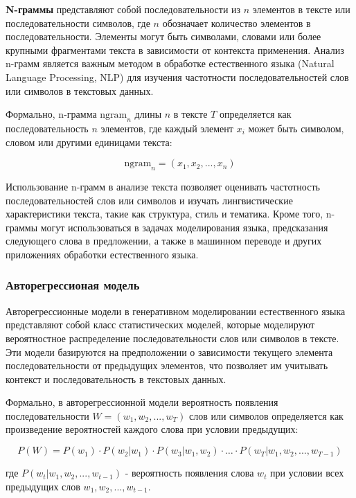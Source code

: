  \textbf{N-граммы} представляют собой последовательности из \( n \) элементов в тексте или последовательности символов, где \( n \) обозначает количество элементов в последовательности. Элементы могут быть символами, словами или более крупными фрагментами текста в зависимости от контекста применения. Анализ n-грамм является важным методом в обработке естественного языка (Natural Language Processing, NLP) для изучения частотности последовательностей слов или символов в текстовых данных.

Формально, n-грамма \( \text{ngram}_n \) длины \( n \) в тексте \( T \) определяется как последовательность \( n \) элементов, где каждый элемент \( x_i \) может быть символом, словом или другими единицами текста:

\[ \text{ngram}_n = (x_1, x_2, ..., x_n) \]

Использование n-грамм в анализе текста позволяет оценивать частотность последовательностей слов или символов и изучать лингвистические характеристики текста, такие как структура, стиль и тематика. Кроме того, n-граммы могут использоваться в задачах моделирования языка, предсказания следующего слова в предложении, а также в машинном переводе и других приложениях обработки естественного языка.

\subsubsection{Авторегрессионая модель}


Авторегрессионные модели в генеративном моделировании естественного языка представляют собой класс статистических моделей, которые моделируют вероятностное распределение последовательности слов или символов в тексте. Эти модели базируются на предположении о зависимости текущего элемента последовательности от предыдущих элементов, что позволяет им учитывать контекст и последовательность в текстовых данных.

Формально, в авторегрессионной модели вероятность появления последовательности \( W = (w_1, w_2, ..., w_T) \) слов или символов определяется как произведение вероятностей каждого слова при условии предыдущих:

\[ P(W) = P(w_1) \cdot P(w_2|w_1) \cdot P(w_3|w_1, w_2) \cdot \ldots \cdot P(w_T|w_1, w_2, ..., w_{T-1}) \]

где \( P(w_t|w_1, w_2, ..., w_{t-1}) \) - вероятность появления слова \( w_t \) при условии всех предыдущих слов \( w_1, w_2, ..., w_{t-1} \).

